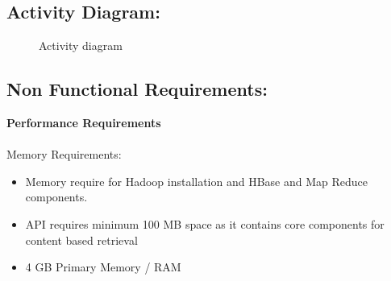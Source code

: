 \documentclass[oneside,a4paper,12pt]{report}
\begin{document}
\subsection{Activity Diagram:}
\begin{center}
	\begin{figure}[H]
		\centering
	  \caption{Activity diagram}
	  \label{fig:act-dig}
	\end{figure}
\end{center}  

\subsection{Non Functional Requirements:}
\textbf{Performance Requirements} \\ \\
Memory Requirements:
\begin{itemize}	
\item Memory require for Hadoop installation and HBase and Map Reduce components.
\item API requires minimum 100 MB space as it contains core components for content based retrieval
\item 4 GB Primary Memory / RAM
\end{itemize}
\end{document}
